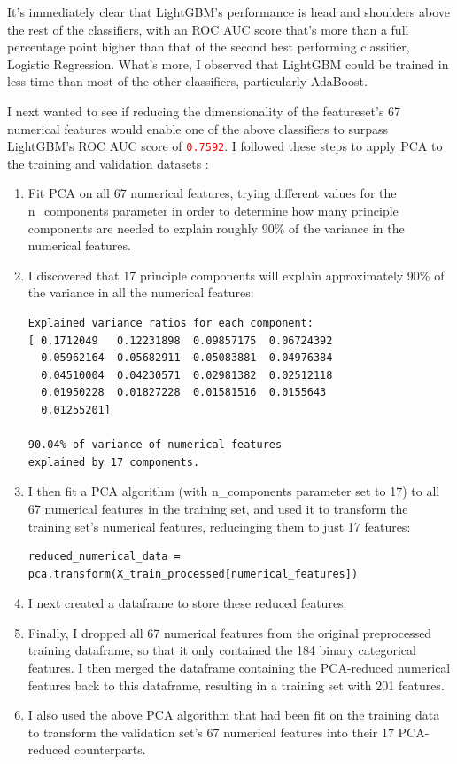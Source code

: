 \documentclass[12pt, letterpaper]{article}
\begin{document}
It's immediately clear that LightGBM's performance is head and shoulders above the rest of the classifiers, with an ROC AUC score that's more than a full percentage point higher than that of the second best performing classifier, Logistic Regression. What's more, I observed that LightGBM could be trained in less time than most of the other classifiers, particularly AdaBoost.

I next wanted to see if reducing the dimensionality of the featureset's 67 numerical features would enable one of the above classifiers to surpass LightGBM's ROC AUC score of \colorbox{backcolor}{\textcolor{red}{\texttt{0.7592}}}. I followed these steps to apply PCA to the training and validation datasets :
\begin{enumerate}
  \item Fit PCA on all 67 numerical features, trying different values for the n_components parameter in order to determine how many principle components are needed to explain roughly 90\% of the variance in the numerical features.
  \item I discovered that 17 principle components will explain approximately 90\% of the variance in all the numerical features:
  \begin{lstlisting}
Explained variance ratios for each component:
[ 0.1712049   0.12231898  0.09857175  0.06724392
  0.05962164  0.05682911  0.05083881  0.04976384
  0.04510004  0.04230571  0.02981382  0.02512118
  0.01950228  0.01827228  0.01581516  0.0155643
  0.01255201]

90.04% of variance of numerical features
explained by 17 components.
  \end{lstlisting}
  \item I then fit a PCA algorithm (with n_components parameter set to 17) to all 67 numerical features in the training set, and used it to transform the training set's numerical features, reducinging them to just 17 features:
  \begin{lstlisting}
reduced_numerical_data =
pca.transform(X_train_processed[numerical_features])
  \end{lstlisting}
  \item I next created a dataframe to store these reduced features.
  \item Finally, I dropped all 67 numerical features from the original preprocessed training dataframe, so that it only contained the 184 binary categorical features. I then merged the dataframe containing the PCA-reduced numerical features back to this dataframe, resulting in a training set with 201 features.
  \item I also used the above PCA algorithm that had been fit on the training data to transform the validation set's 67 numerical features into their 17 PCA-reduced counterparts.
\end {enumerate}
\end{document}
